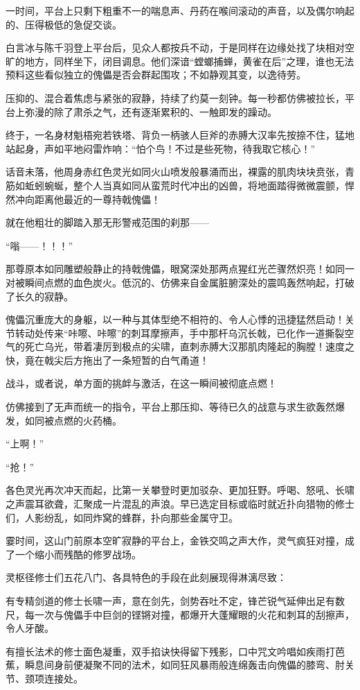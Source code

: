 一时间，平台上只剩下粗重不一的喘息声、丹药在喉间滚动的声音，以及偶尔响起的、压得极低的急促交谈。

白言冰与陈千羽登上平台后，见众人都按兵不动，于是同样在边缘处找了块相对空旷的地方，同样坐下，闭目调息。他们深谙“螳螂捕蝉，黄雀在后”之理，谁也无法预料这些看似独立的傀儡是否会群起围攻；不如静观其变，以逸待劳。

压抑的、混合着焦虑与紧张的寂静，持续了约莫一刻钟。每一秒都仿佛被拉长，平台上弥漫的除了肃杀之气，还有逐渐累积的、一触即发的躁动。

终于，一名身材魁梧宛若铁塔、背负一柄骇人巨斧的赤膊大汉率先按捺不住，猛地站起身，声如平地闷雷炸响：“怕个鸟！不过是些死物，待我取它核心！”

话音未落，他周身赤红色灵光如同火山喷发般暴涌而出，裸露的肌肉块块贲张，青筋如蚯蚓蜿蜒，整个人当真如同从蛮荒时代冲出的凶兽，将地面踏得微微震颤，悍然冲向距离他最近的一尊持戟傀儡！

就在他粗壮的脚踏入那无形警戒范围的刹那——

“嗡——！！！”

那尊原本如同雕塑般静止的持戟傀儡，眼窝深处那两点猩红光芒骤然炽亮！如同一对被瞬间点燃的血色炭火。低沉的、仿佛来自金属脏腑深处的震鸣轰然响起，打破了长久的寂静。

傀儡沉重庞大的身躯，以一种与其体型绝不相符的、令人心悸的迅捷猛然启动！关节转动处传来“咔嚓、咔嚓”的刺耳摩擦声，手中那杆乌沉长戟，已化作一道撕裂空气的死亡乌光，带着凄厉到极点的尖啸，直刺赤膊大汉那肌肉隆起的胸膛！速度之快，竟在戟尖后方拖出了一条短暂的白气甬道！

战斗，或者说，单方面的挑衅与激活，在这一瞬间被彻底点燃！

仿佛接到了无声而统一的指令，平台上那压抑、等待已久的战意与求生欲轰然爆发，如同被点燃的火药桶。

“上啊！”

“抢！”

各色灵光再次冲天而起，比第一关攀登时更加驳杂、更加狂野。呼喝、怒吼、长啸之声震耳欲聋，汇聚成一片混乱的声浪。早已选定目标或临时就近扑向猎物的修士们，人影纷乱，如同炸窝的蜂群，扑向那些金属守卫。

霎时间，这山门前原本空旷寂静的平台上，金铁交鸣之声大作，灵气疯狂对撞，成了一个缩小而残酷的修罗战场。

灵枢径修士们五花八门、各具特色的手段在此刻展现得淋漓尽致：

有专精剑道的修士长啸一声，意在剑先，剑势吞吐不定，锋芒锐气延伸出足有数尺，每一次与傀儡手中巨剑的铿锵对撞，都爆开大蓬耀眼的火花和刺耳的刮擦声，令人牙酸。

有擅长法术的修士面色凝重，双手掐诀快得留下残影，口中咒文吟唱如疾雨打芭蕉，瞬息间身前便凝聚不同的法术，如同狂风暴雨般连绵轰击向傀儡的膝弯、肘关节、颈项连接处。

